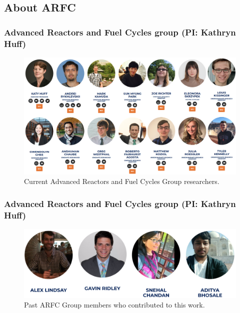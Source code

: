 \subsection{About ARFC}
\begin{frame}
  \frametitle{Advanced Reactors and Fuel Cycles group (PI: Kathryn Huff)}
               \begin{figure}[t]
                \vspace*{-0.15in}
                \hspace*{-0.35in}
                \includegraphics[height=0.63\textwidth]{./images/arfc1.png}
                \caption{Current Advanced Reactors and Fuel Cycles Group researchers.}
               \end{figure}            
\end{frame}

\begin{frame}
  \frametitle{Advanced Reactors and Fuel Cycles group (PI: Kathryn Huff)}
               \begin{figure}[t]
                \includegraphics[height=0.33\textwidth]{./images/arfc_past.png}
                \caption{Past ARFC Group members who contributed to this work.}
               \end{figure}            
\end{frame}


